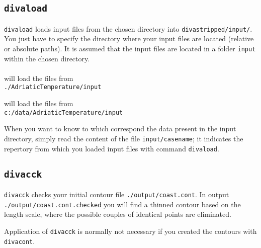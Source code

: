 \subsection{\texttt{divaload}\label{sec:divaload}}

\texttt{divaload} loads input files from the chosen directory into \texttt{divastripped/input/}. You just have to specify the directory where your input files are located (relative or absolute paths). It is assumed that the input files are located in a folder \texttt{input} within the chosen directory.\\
\examples\\
 will load the files from\\
 \texttt{./\-Adriatic\-Temperature/\-input}
 
 will load the files from\\
\texttt{c:/\-data/\-Adriatic\-Temperature/\-input}

\btips
When you want to know to which correspond the data present in the input directory, simply read the content of the file \texttt{input/casename}; it indicates the repertory from which you loaded input files with command \texttt{divaload}.
\etips


\subsection{\texttt{divacck}}

\texttt{divacck} checks your initial contour file \texttt{./output/coast.cont}. In output \texttt{./\-output/\-coast.cont\-.checked} you will find a thinned contour based on the length scale, where the possible couples of identical points are eliminated.

Application of \texttt{divacck} is normally not necessary if you created the contours with \texttt{divacont}.
